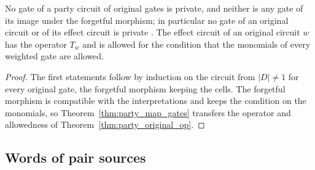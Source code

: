 \begin{theorem}
    \label{thm:party_original_effect}
    \leanok
    No gate of a party circuit of original gates is private, and neither is any gate of
    its image under the forgetful morphism; in particular no gate of an original
    circuit or of its effect circuit is private
    \cite[Section~5.1]{OpenAI2026PolynomialPEPS}. The effect circuit of an original
    circuit $w$ has the operator $T_w$ and is allowed for the condition that the
    monomials of every weighted gate are allowed.
\end{theorem}
\begin{proof}\leanok
    The first statements follow by induction on the circuit from $|D|\neq1$ for every
    original gate, the forgetful morphism keeping the cells. The forgetful morphism is
    compatible with the interpretations and keeps the condition on the monomials, so
    Theorem~\ref{thm:party_map_gates} transfers the operator and allowedness of
    Theorem~\ref{thm:party_original_op}.
\end{proof}

\subsection{Words of pair sources}
\label{sec:party_syntax_words}


